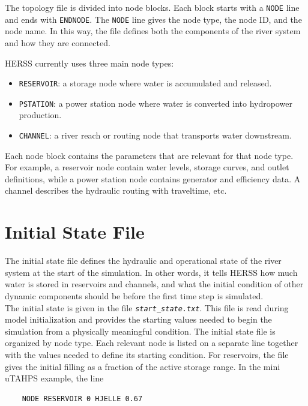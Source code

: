 \documentclass[a4paper, 12pt]{report}
\newcommand{\file}[1]{\textit{\texttt{#1}}}  %
\begin{document}
	The topology file is divided into node blocks. Each block starts with a \texttt{NODE} line and ends with \texttt{ENDNODE}. The \texttt{NODE} line gives the node type, the node ID, and the node name. In this way, the file defines both the components of the river system and how they are connected.

	HERSS currently uses three main node types:

	\begin{itemize}
		\item \texttt{RESERVOIR}: a storage node where water is accumulated and released.
		\item \texttt{PSTATION}: a power station node where water is converted into hydropower production.
		\item \texttt{CHANNEL}: a river reach or routing node that transports water downstream.
	\end{itemize}

	Each node block contains the parameters that are relevant for that node type. For example, a reservoir node contain water levels, storage curves, and outlet definitions, while a power station node contains generator and efficiency data. A channel describes the hydraulic routing with traveltime, etc. 


   \section{Initial State File}
   
   The initial state file defines the hydraulic and operational state of the river system at the start of the simulation. In other words, it tells HERSS how much water is stored in reservoirs and channels, and what the initial condition of other dynamic components should be before the first time step is simulated. \\
   
   The initial state is given in the file \file{start\_state.txt}. This file is read during model initialization and provides the starting values needed to begin the simulation from a physically meaningful condition. The initial state file is organized by node type. Each relevant node is listed on a separate line together with the values needed to define its starting condition. For reservoirs, the file gives the initial filling as a fraction of the active storage range. In the mini uTAHPS example, the line
   
   \begin{verbatim}
   	NODE RESERVOIR 0 HJELLE 0.67
   \end{verbatim}
   
\end{document}
